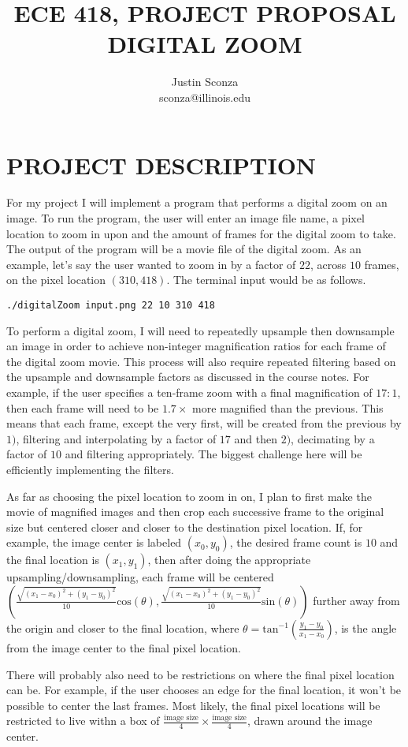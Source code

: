 \documentclass{article}
\title{\sffamily\textbf{ECE 418, PROJECT PROPOSAL\\ DIGITAL ZOOM}}
\author{Justin Sconza\\sconza@illinois.edu}
\begin{document}
	\maketitle
	
	\section{PROJECT DESCRIPTION}
	
	For my project I will implement a program that performs a digital zoom on an image.  To run the program, the user will enter an image file name, a pixel location to zoom in upon and the amount of frames for the digital zoom to take.  The output of the program will  be a movie file of the digital zoom.  As an example, let's say the user wanted to zoom in by a factor of $22$, across $10$ frames, on the pixel location $(310, 418)$.  The terminal input would be as follows.
	
	\vspace{3mm}
	
	\noindent
	\texttt{./digitalZoom input.png 22 10 310 418 }
	
	\vspace{3mm}
	
	To perform a digital zoom, I will need to repeatedly upsample then downsample an image in order to achieve non-integer magnification ratios for each frame of the digital zoom movie.  This process will also require repeated filtering based on the upsample and downsample factors as discussed in the course notes.  For example, if the user specifies a ten-frame zoom with a final magnification of $17:1$, then each frame will need to be $1.7 \times$ more magnified than the previous.  This means that each frame, except the very first, will be created from the previous by $1)$, filtering and interpolating by a factor of $17$ and then $2)$, decimating by a factor of $10$ and filtering appropriately.  The biggest challenge here will be efficiently implementing the filters.
	
	As far as choosing the pixel location to zoom in on, I plan to first make the movie of magnified images and then crop each successive frame to the original size but centered closer and closer to the destination pixel location.  If, for example, the image center is labeled $(x_0, y_0)$, the desired frame count is $10$ and the final location is $(x_1, y_1)$, then after doing the appropriate upsampling/downsampling, each frame will be centered $\left( \frac{\sqrt{(x_1 - x_0)^2 + (y_1 - y_0)^2}}{10} \text{cos}(\theta),  \frac{\sqrt{(x_1 - x_0)^2 + (y_1 - y_0)^2}}{10} \text{sin}(\theta) \right)$ further away from the origin and closer to the final location, where $\theta = \text{tan}^{-1} \left( \frac{y_1 - y_0}{x_1 - x_0}\right)$, is the angle from the image center to the final pixel location. 
	
	There will probably also need to be restrictions on where the final pixel location can be.  For example, if the user chooses an edge for the final location, it won't be possible to center the last frames.  Most likely, the final pixel locations will be restricted to live withn a box of $\frac{\text{image size}}{4} \times \frac{\text{image size}}{4}$, drawn around the image center.
	
	
\end{document}
